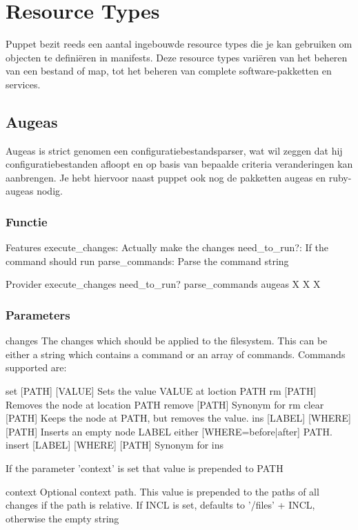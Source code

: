 \chapter{Resource Types}
Puppet bezit reeds een aantal ingebouwde resource types die je kan gebruiken om objecten te defini\"{e}ren in manifests. Deze resource types vari\"{e}ren van het beheren van een bestand of map, tot het beheren van complete software-pakketten en services.\\

\section{Augeas}
Augeas is strict genomen een configuratiebestandsparser, wat wil zeggen dat hij configuratiebestanden afloopt en op basis van bepaalde criteria veranderingen kan aanbrengen. Je hebt hiervoor naast puppet ook nog de pakketten augeas en ruby-augeas nodig.

\subsection{Functie}

Features
    execute\_changes: Actually make the changes
    need\_to\_run?: If the command should run
    parse\_commands: Parse the command string

Provider 	execute\_changes 	need\_to\_run? 	parse\_commands
augeas		X 			X 		X

\subsection{Parameters}
changes
The changes which should be applied to the filesystem. This can be either a string which contains a command or an array of commands. Commands supported are:

set [PATH] [VALUE]            Sets the value VALUE at loction PATH
rm [PATH]                     Removes the node at location PATH
remove [PATH]                 Synonym for rm
clear [PATH]                  Keeps the node at PATH, but removes the value.
ins [LABEL] [WHERE] [PATH]    Inserts an empty node LABEL either [WHERE={before|after}] PATH.
insert [LABEL] [WHERE] [PATH] Synonym for ins

If the parameter 'context' is set that value is prepended to PATH

context
Optional context path. This value is prepended to the paths of all changes if the path is relative. If INCL is set, defaults to '/files' + INCL, otherwise the empty string

